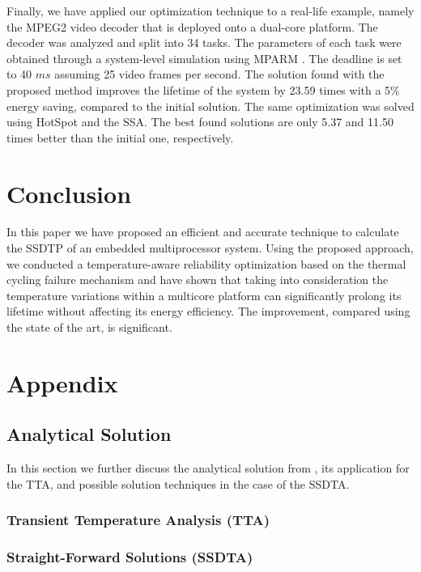 Finally, we have applied our optimization technique to a real-life example,
namely the MPEG2 video decoder \cite{ffmpeg2011} that is deployed onto a
dual-core platform. The decoder was analyzed and split into 34 tasks. The
parameters of each task were obtained through a system-level simulation using
MPARM \cite{benini2005}. The deadline is set to 40 $ms$ assuming 25 video frames
per second. The solution found with the proposed method improves the lifetime of
the system by 23.59 times with a 5\% energy saving, compared to the initial
solution. The same optimization was solved using HotSpot and the SSA. The best
found solutions are only 5.37 and 11.50 times better than the initial one,
respectively.

\section{Conclusion}

In this paper we have proposed an efficient and accurate technique to calculate
the SSDTP of an embedded multiprocessor system. Using the proposed approach, we
conducted a temperature-aware reliability optimization based on the thermal
cycling failure mechanism and have shown that taking into consideration the
temperature variations within a multicore platform can significantly prolong its
lifetime without affecting its energy efficiency. The improvement, compared
using the state of the art, is significant.

\section{Appendix}

\subsection{Analytical Solution}

In this section we further discuss the analytical solution from
, its application for the TTA, and possible solution
techniques in the case of the SSDTA.

\subsubsection{Transient Temperature Analysis (TTA)}

\subsubsection{Straight-Forward Solutions (SSDTA)}

